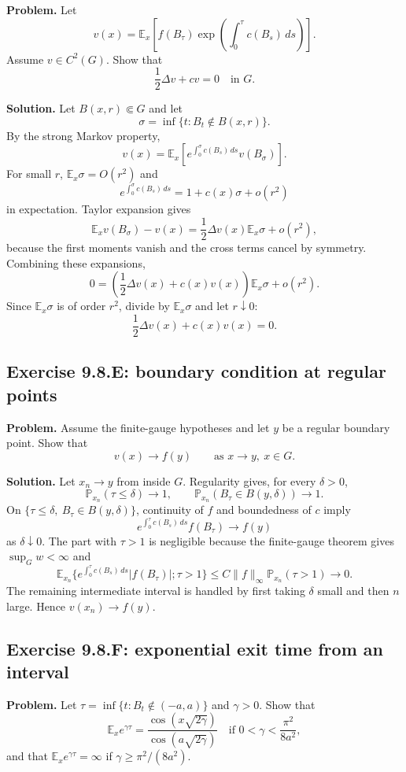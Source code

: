 \documentclass[11pt]{article}
\newcommand{\Prob}{\mathbb{P}}
\newcommand{\E}{\mathbb{E}}
\newcommand{\dd}{\,d}
\newcommand{\Del}{\Delta}
\begin{document}
\noindent\textbf{Problem.}
Let
\[
  v(x)=
  \E_x\left[
    f(B_\tau)\exp\left(\int_0^\tau c(B_s)\dd s\right)
  \right].
\]
Assume $v\in C^2(G)$.  Show that
\[
  \frac12\Del v+c v=0\quad\text{in }G.
\]

\noindent\textbf{Solution.}
Let $B(x,r)\Subset G$ and let
\[
  \sigma=\inf\{t:B_t\notin B(x,r)\}.
\]
By the strong Markov property,
\[
  v(x)=
  \E_x\left[
    e^{\int_0^\sigma c(B_s)\dd s}v(B_\sigma)
  \right].
\]
For small $r$, $\E_x\sigma=O(r^2)$ and
\[
  e^{\int_0^\sigma c(B_s)\dd s}
  =
  1+c(x)\sigma+o(r^2)
\]
in expectation.  Taylor expansion gives
\[
  \E_x v(B_\sigma)-v(x)
  =
  \frac12\Del v(x)\E_x\sigma+o(r^2),
\]
because the first moments vanish and the cross terms cancel by
symmetry.  Combining these expansions,
\[
  0=
  \left(\frac12\Del v(x)+c(x)v(x)\right)\E_x\sigma+o(r^2).
\]
Since $\E_x\sigma$ is of order $r^2$, divide by $\E_x\sigma$ and let
$r\downarrow0$:
\[
  \frac12\Del v(x)+c(x)v(x)=0.
\]

\subsection*{Exercise 9.8.E: boundary condition at regular points}

\noindent\textbf{Problem.}
Assume the finite-gauge hypotheses and let $y$ be a regular boundary
point.  Show that
\[
  v(x)\to f(y)
  \qquad\text{as }x\to y,\ x\in G.
\]

\noindent\textbf{Solution.}
Let $x_n\to y$ from inside $G$.  Regularity gives, for every
$\delta>0$,
\[
  \Prob_{x_n}(\tau\le\delta)\to1,
  \qquad
  \Prob_{x_n}(B_\tau\in B(y,\delta))\to1.
\]
On $\{\tau\le\delta,\ B_\tau\in B(y,\delta)\}$, continuity of $f$ and
boundedness of $c$ imply
\[
  e^{\int_0^\tau c(B_s)\dd s}f(B_\tau)\to f(y)
\]
as $\delta\downarrow0$.  The part with $\tau>1$ is negligible because
the finite-gauge theorem gives $\sup_G w<\infty$ and
\[
  \E_{x_n}\{e^{\int_0^\tau c(B_s)\dd s}|f(B_\tau)|;\tau>1\}
  \le
  C\|f\|_\infty \Prob_{x_n}(\tau>1)\to0.
\]
The remaining intermediate interval is handled by first taking
$\delta$ small and then $n$ large.  Hence $v(x_n)\to f(y)$.

\subsection*{Exercise 9.8.F: exponential exit time from an interval}

\noindent\textbf{Problem.}
Let $\tau=\inf\{t:B_t\notin(-a,a)\}$ and $\gamma>0$.  Show that
\[
  \E_x e^{\gamma\tau}
  =
  \frac{\cos(x\sqrt{2\gamma})}{\cos(a\sqrt{2\gamma})}
  \quad\text{if }0<\gamma<\frac{\pi^2}{8a^2},
\]
and that $\E_xe^{\gamma\tau}=\infty$ if
$\gamma\ge \pi^2/(8a^2)$.
\end{document}
